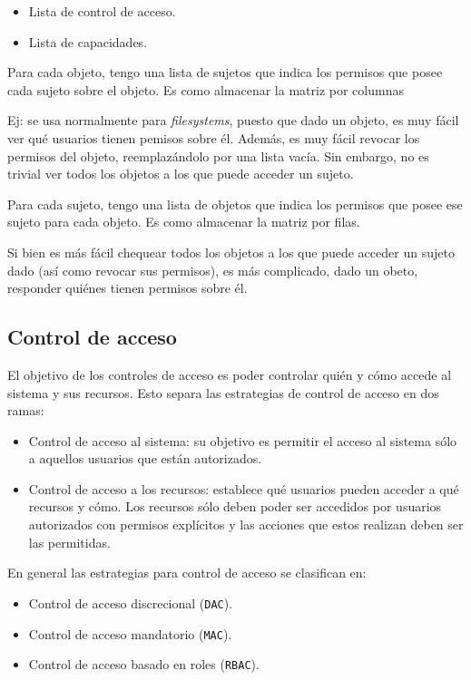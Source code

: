 \documentclass[]{article}
\begin{document}
\begin{itemize}
	\item Lista de control de acceso.
	\item Lista de capacidades.
\end{itemize}

Para cada objeto, tengo una lista de sujetos que indica los permisos que posee cada sujeto sobre el objeto. Es como almacenar la matriz por columnas

Ej: se usa normalmente para \emph{filesystems}, puesto que dado un objeto, es muy fácil ver qué usuarios tienen pemisos sobre él. Además, es muy fácil revocar los permisos del objeto, reemplazándolo por una lista vacía. Sin embargo, no es trivial ver todos los objetos a los que puede acceder un sujeto.



Para cada sujeto, tengo una lista de objetos que indica los permisos que posee ese sujeto para cada objeto. Es como almacenar la matriz por filas.

Si bien es más fácil chequear todos los objetos a los que puede acceder un sujeto dado (así como revocar sus permisos), es más complicado, dado un obeto, responder quiénes tienen permisos sobre él.

\subsection{Control de acceso}
El objetivo de los controles de acceso es poder controlar quién y cómo accede al sistema y sus recursos. Esto separa las estrategias de control de acceso en dos ramas:
\begin{itemize}
	\item Control de acceso al sistema: su objetivo es permitir el acceso al sistema sólo a aquellos usuarios que están autorizados.
	\item Control de acceso a los recursos: establece qué usuarios pueden acceder a qué recursos y cómo. Los recursos sólo deben poder ser accedidos por usuarios autorizados con permisos explícitos y las acciones que estos realizan deben ser las permitidas.
\end{itemize}


En general las estrategias para control de acceso se clasifican en:
\begin{itemize}
	\item Control de acceso discrecional (\texttt{DAC}).
	\item Control de acceso mandatorio (\texttt{MAC}).
	\item Control de acceso basado en roles (\texttt{RBAC}).
\end{itemize}
\end{document}
